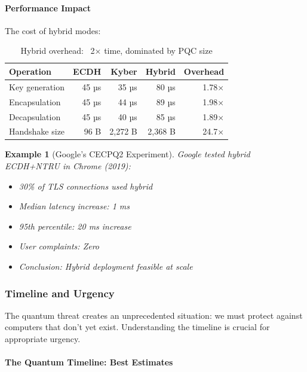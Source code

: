 \documentclass[11pt,a4paper]{article}
\newtheorem{example}{Example}
\begin{document}
\paragraph{Performance Impact}

The cost of hybrid modes:

\begin{table}[h]
\centering
\begin{tabular}{|l|r|r|r|r|}
\hline
\textbf{Operation} & \textbf{ECDH} & \textbf{Kyber} & \textbf{Hybrid} & \textbf{Overhead} \\
\hline
Key generation & 45 µs & 35 µs & 80 µs & 1.78× \\
Encapsulation & 45 µs & 44 µs & 89 µs & 1.98× \\
Decapsulation & 45 µs & 40 µs & 85 µs & 1.89× \\
Handshake size & 96 B & 2,272 B & 2,368 B & 24.7× \\
\hline
\end{tabular}
\caption{Hybrid overhead: ~2× time, dominated by PQC size}
\end{table}

\begin{example}[Google's CECPQ2 Experiment]
Google tested hybrid ECDH+NTRU in Chrome (2019):
\begin{itemize}
    \item 30\% of TLS connections used hybrid
    \item Median latency increase: 1 ms
    \item 95th percentile: 20 ms increase
    \item User complaints: Zero
    \item Conclusion: Hybrid deployment feasible at scale
\end{itemize}
\end{example}

\subsubsection{Timeline and Urgency}

The quantum threat creates an unprecedented situation: we must protect against computers that don't yet exist. Understanding the timeline is crucial for appropriate urgency.

\paragraph{The Quantum Timeline: Best Estimates}
\end{document}
